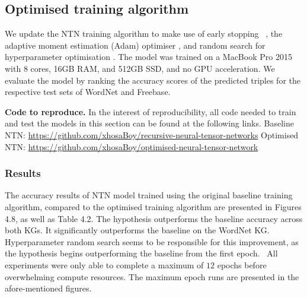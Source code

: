 
\subsection{Optimised training algorithm}

\noindent We update the NTN training algorithm to make use of early stopping \unskip ~\citep{prechelt1998early}, the adaptive moment estimation (Adam) optimiser \citep{kingma2014adam}, and random search for hyperparameter optimisation \citep{bergstra2012random}. The model was trained on a MacBook Pro 2015 with 8 cores, 16GB RAM, and 512GB SSD, and no GPU acceleration. We evaluate the model by ranking the accuracy scores of the predicted triples for the respective test sets of WordNet and Freebase. \par

\noindent \textbf{Code to reproduce.} In the interest of reproducibility, all code needed to train and test the models in this section can be found at the following links. \newline
Baseline NTN: \url{https://github.com/xhosaBoy/recursive-neural-tensor-networks} \newline
Optimised NTN: \url{https://github.com/xhosaBoy/optimised-neural-tensor-network} 

\subsubsection{Results} 

The accuracy results of NTN model trained using the original baseline training algorithm, compared to the optimised training algorithm are presented in Figures 4.8, as well as Table 4.2. The hypothesis outperforms the baseline accuracy across both KGs. It significantly outperforms the baseline on the WordNet KG. Hyperparameter random search seems to be responsible for this improvement, as the hypothesis begins outperforming the baseline from the first epoch. \ All experiments were only able to complete a maximum of $ 12 $ epochs before overwhelming compute resources. The maximum epoch runs are presented in the afore-mentioned figures. \par


